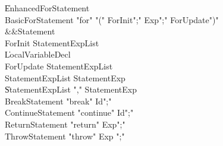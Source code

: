 \begin{grammar}
    \|   EnhancedForStatement\\
 BasicForStatement  \:   \xcd"for"  \xcd"("  ForInit\opt  \xcd";"  Exp\opt  \xcd";"  ForUpdate\opt  \xcd")"\\
          &&Statement\\
 ForInit  \:   StatementExpList\\
    \|   LocalVariableDecl\\
 ForUpdate  \:   StatementExpList\\
 StatementExpList  \:   StatementExp\\
    \|   StatementExpList  \xcd","  StatementExp\\
 BreakStatement  \:   \xcd"break"  Id\opt  \xcd";"\\
 ContinueStatement  \:   \xcd"continue"  Id\opt  \xcd";"\\
 ReturnStatement  \:   \xcd"return"  Exp\opt  \xcd";"\\
 ThrowStatement  \:   \xcd"throw"  Exp  \xcd";"\\
\end{grammar}

